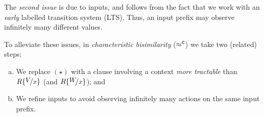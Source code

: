 The \emph{second issue} is due to inputs, and  
follows from 
the fact that we work with an \emph{early}
labelled transition system (LTS). Thus, %
an input prefix may observe
infinitely many different values.

To alleviate these issues,
in %
\emph{characteristic
bisimilarity} ($\approx^\mathtt{C}$)
we take two (related) steps: 
\begin{enumerate}[(a)]
	\item We replace $(\star)$ with a clause involving a context \emph{more tractable} than $R\subst{V}{x}$ (and $R\subst{W}{x}$); and 
	\item We refine  inputs %
	to avoid observing infinitely many actions on the same input prefix.
\end{enumerate}


\begin{comment}
\myparagraph{Issues of Context Bisimilarity.}
Context bisimilarity ($\wbc$, \defref{def:wbc}) is an overly demanding relation on higher-order processes. 
This issue may be better appreciated by examining the output clause of context bisimilarity.
Suppose $P \,\Re\, Q$, for some context bisimulation $\Re$. Then:
\begin{enumerate}[$(\star)$]
	\item	Whenever 
		$P \by{\news{\widetilde{m_1}} \bactout{n}{V}} P'$
		there exist
		$Q'$ and $W$
		such that 
		$Q \by{\news{\widetilde{m_2}} \bactout{n}{W}} Q'$
		and, \emph{\textbf{for all} $R$}  with $\fv{R}=x$, 
		$\newsp{\widetilde{m_1}}{P' \Par R\subst{V}{x}} \,\Re\, \newsp{\widetilde{m_2}}{Q' \Par R\subst{W}{x}}$.
\end{enumerate}
\smallskip 
\noi 
Above, 
$\news{\widetilde{m_1}} \bactout{n}{V}$ is the output label of 
value $V$ with extrusion of names in $\widetilde{m_1}$.
To reduce the burden induced by 
universal quantification, we introduce 
\emph{characteristic}  
bisimilarity ($\fwb$). %
As we work with an \emph{early} labelled transition system (LTS), 
%
we take the following two steps: 
%
\begin{enumerate}[(a)]
	\item replace $(\star)$ with a clause involving a more tractable process closure; and 
	\item refine the input LTS rule 
	to avoid observing infinitely many actions on the same input prefix.
\end{enumerate}
%
\end{comment}


